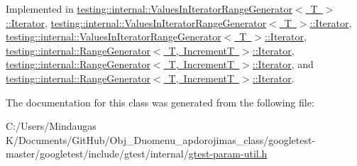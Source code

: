 Implemented in \mbox{\hyperlink{classtesting_1_1internal_1_1_values_in_iterator_range_generator_1_1_iterator_a75604bc318aca22ff8607b68bfb44e96}{testing\+::internal\+::\+Values\+In\+Iterator\+Range\+Generator$<$ T $>$\+::\+Iterator}}, \mbox{\hyperlink{classtesting_1_1internal_1_1_values_in_iterator_range_generator_1_1_iterator_a75604bc318aca22ff8607b68bfb44e96}{testing\+::internal\+::\+Values\+In\+Iterator\+Range\+Generator$<$ T $>$\+::\+Iterator}}, \mbox{\hyperlink{classtesting_1_1internal_1_1_values_in_iterator_range_generator_1_1_iterator_aff9f8c1c01a4e708235d8793b2c44d31}{testing\+::internal\+::\+Values\+In\+Iterator\+Range\+Generator$<$ T $>$\+::\+Iterator}}, \mbox{\hyperlink{classtesting_1_1internal_1_1_range_generator_1_1_iterator_a534406abbddb137d7672c2b53d5bff0b}{testing\+::internal\+::\+Range\+Generator$<$ T, Increment\+T $>$\+::\+Iterator}}, \mbox{\hyperlink{classtesting_1_1internal_1_1_range_generator_1_1_iterator_a534406abbddb137d7672c2b53d5bff0b}{testing\+::internal\+::\+Range\+Generator$<$ T, Increment\+T $>$\+::\+Iterator}}, and \mbox{\hyperlink{classtesting_1_1internal_1_1_range_generator_1_1_iterator_a2ae0f453be98bdcfffecc3c71c7a9879}{testing\+::internal\+::\+Range\+Generator$<$ T, Increment\+T $>$\+::\+Iterator}}.



The documentation for this class was generated from the following file\+:\begin{DoxyCompactItemize}
\item 
C\+:/\+Users/\+Mindaugas K/\+Documents/\+Git\+Hub/\+Obj\+\_\+\+Duomenu\+\_\+apdorojimas\+\_\+class/googletest-\/master/googletest/include/gtest/internal/\mbox{\hyperlink{googletest-master_2googletest_2include_2gtest_2internal_2gtest-param-util_8h}{gtest-\/param-\/util.\+h}}\end{DoxyCompactItemize}

